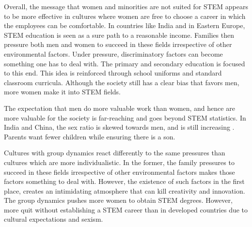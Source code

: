 \documentclass[utf8]{frontiersSCNS} %
\begin{document}


Overall, the message that women and minorities are not suited for STEM appears to be more effective in cultures where women are free to choose a career in which the employees can be comfortable. In countries like India and in Eastern Europe, STEM education is seen as a sure path to a reasonable income. Families then pressure both men and women to succeed in these fields irrespective of other environmental factors. Under pressure, discriminatory factors can become something one has to deal with.  The primary and secondary education is focused to this end. This idea is reinforced through school uniforms and standard classroom curricula. Although the society still has a clear bias that favors men, more women make it into STEM fields.
 
The expectation that men do more valuable work than women, and hence are more valuable for the society is far-reaching and goes beyond STEM statistics. In India and China, the sex ratio is skewed towards men, and is still increasing \citep{YouthIndia,hesketh2011consequences}. Parents want fewer children while ensuring there is a son.

Cultures with group dynamics react differently to the same pressures than cultures which are more individualistic. In the former, the family pressures to succeed in these fields irrespective of other environmental factors makes those factors something to deal with. However, the existence of such factors in the first place, creates an intimidating atmosphere that can kill creativity and innovation. The group dynamics pushes more women to obtain STEM degrees. However, more quit without establishing a STEM career than in developed countries due to cultural expectations and sexism. 
\end{document}

